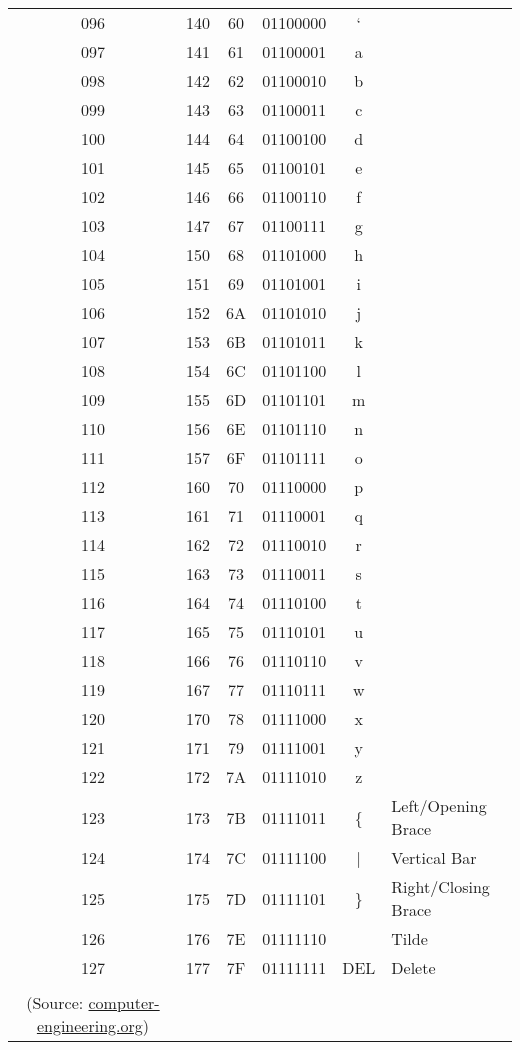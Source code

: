 \documentclass{article}
\begin{document}
\begin{longtable}{|c|c|c|c|c|l|}
       
       096 & 140 & 60 & 01100000 & `   & \\
       097 & 141 & 61 & 01100001 & a   & \\
       098 & 142 & 62 & 01100010 & b   & \\
       099 & 143 & 63 & 01100011 & c   & \\
       100 & 144 & 64 & 01100100 & d   & \\
       101 & 145 & 65 & 01100101 & e   & \\
       102 & 146 & 66 & 01100110 & f   & \\
       103 & 147 & 67 & 01100111 & g   & \\
       104 & 150 & 68 & 01101000 & h   & \\
       105 & 151 & 69 & 01101001 & i   & \\
       106 & 152 & 6A & 01101010 & j   & \\
       107 & 153 & 6B & 01101011 & k   & \\
       108 & 154 & 6C & 01101100 & l   & \\
       109 & 155 & 6D & 01101101 & m   & \\
       110 & 156 & 6E & 01101110 & n   & \\
       111 & 157 & 6F & 01101111 & o   & \\
       112 & 160 & 70 & 01110000 & p   & \\
       113 & 161 & 71 & 01110001 & q   & \\
       114 & 162 & 72 & 01110010 & r   & \\
       115 & 163 & 73 & 01110011 & s   & \\
       116 & 164 & 74 & 01110100 & t   & \\
       117 & 165 & 75 & 01110101 & u   & \\
       118 & 166 & 76 & 01110110 & v   & \\
       119 & 167 & 77 & 01110111 & w   & \\
       120 & 170 & 78 & 01111000 & x   & \\
       121 & 171 & 79 & 01111001 & y   & \\
       122 & 172 & 7A & 01111010 & z   & \\
       123 & 173 & 7B & 01111011 & \{   & Left/Opening Brace\\
       124 & 174 & 7C & 01111100 & |   & Vertical Bar\\
       125 & 175 & 7D & 01111101 & \}   & Right/Closing Brace\\
       126 & 176 & 7E & 01111110 & ~   & Tilde\\
       127 & 177 & 7F & 01111111 & DEL & Delete\\
       \hline
    \caption{Keyboard Scan Code table \\(Source: \href{http://www.computer-engineering.org/ps2keyboard/scancodes2.html}{computer-engineering.org})}
    \end{longtable}
\end{document}
